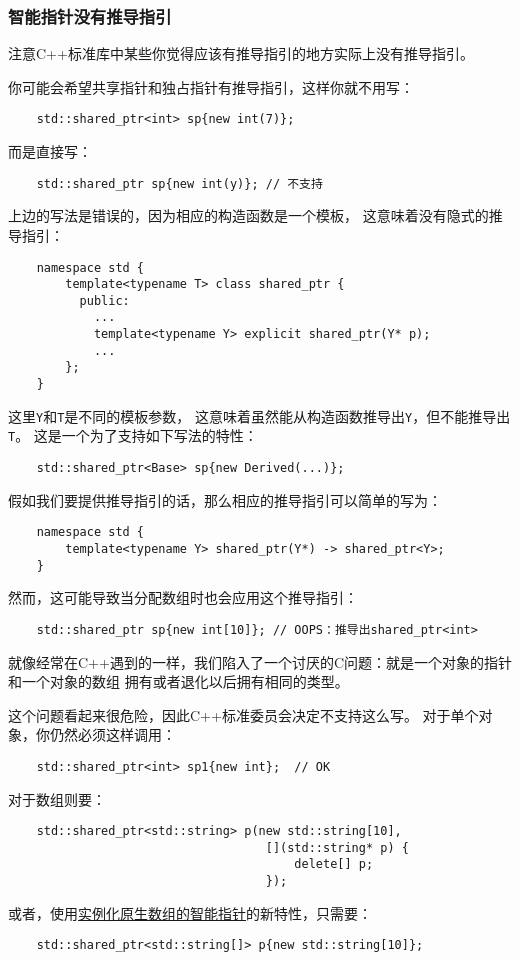 \subsubsection{智能指针没有推导指引}
注意C++标准库中某些你觉得应该有推导指引的地方实际上没有推导指引。

你可能会希望共享指针和独占指针有推导指引，这样你就不用写：
\begin{lstlisting}
    std::shared_ptr<int> sp{new int(7)};
\end{lstlisting}
而是直接写：
\begin{lstlisting}
    std::shared_ptr sp{new int(y)}; // 不支持
\end{lstlisting}
上边的写法是错误的，因为相应的构造函数是一个模板，
这意味着没有隐式的推导指引：
\begin{lstlisting}
    namespace std {
        template<typename T> class shared_ptr {
          public:
            ...
            template<typename Y> explicit shared_ptr(Y* p);
            ...
        };
    }
\end{lstlisting}
这里\texttt{Y}和\texttt{T}是不同的模板参数，
这意味着虽然能从构造函数推导出\texttt{Y}，但不能推导出\texttt{T}。
这是一个为了支持如下写法的特性：
\begin{lstlisting}
    std::shared_ptr<Base> sp{new Derived(...)};
\end{lstlisting}
假如我们要提供推导指引的话，那么相应的推导指引可以简单的写为：
\begin{lstlisting}
    namespace std {
        template<typename Y> shared_ptr(Y*) -> shared_ptr<Y>;
    }
\end{lstlisting}
然而，这可能导致当分配数组时也会应用这个推导指引：
\begin{lstlisting}
    std::shared_ptr sp{new int[10]}; // OOPS：推导出shared_ptr<int>
\end{lstlisting}
就像经常在C++遇到的一样，我们陷入了一个讨厌的C问题：就是一个对象的指针和一个对象的数组
拥有或者退化以后拥有相同的类型。

这个问题看起来很危险，因此C++标准委员会决定不支持这么写。
对于单个对象，你仍然必须这样调用：
\begin{lstlisting}
    std::shared_ptr<int> sp1{new int};  // OK
\end{lstlisting}
对于数组则要：
\begin{lstlisting}
    std::shared_ptr<std::string> p(new std::string[10],
                                    [](std::string* p) {
                                        delete[] p;
                                    });
\end{lstlisting}
或者，使用\hyperref[ch28.2.1]{实例化原生数组的智能指针}的新特性，只需要：
\begin{lstlisting}
    std::shared_ptr<std::string[]> p{new std::string[10]};
\end{lstlisting}

